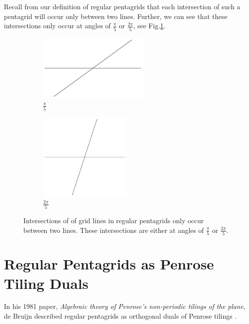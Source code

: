 \documentclass[
  oneside,
  11pt, a4paper,
  footinclude=true,
  headinclude=true,
  cleardoublepage=empty
]{scrbook}
\begin{document}
Recall from our definition of regular pentagrids that each intersection of such a pentagrid will occur only between two lines. Further, we can see that these intersections only occur at angles of $\frac{\pi}{5}$ or $\frac{2\pi}{5}$, see Fig.\ref{fig:intersections}.

\begin{figure}[H]
\centering
\begin{subfigure}[b]{0.5\textwidth}
\centering
\includegraphics[width=0.6\textwidth]{Intersection1}
\caption{$\frac{\pi}{5}$}
\end{subfigure}\hfill
\begin{subfigure}[b]{0.5\textwidth}
\centering
\includegraphics[width=0.5\textwidth]{Intersection2}
\caption{$\frac{2\pi}{5}$}
\end{subfigure}

\caption[Two types of grid line intersections]{Intersections of of grid lines in regular pentagrids only occur between two lines. These intersections are either at angles of $\frac{\pi}{5}$ or $\frac{2\pi}{5}$. }
\label{fig:intersections}
\end{figure}


\section{Regular Pentagrids as Penrose Tiling Duals}
In his 1981 paper, \textit{Algebraic theory of Penrose's non-periodic tilings of the plane}, de Bruijn described regular pentagrids as orthogonal duals of Penrose tilings \cite{DeBruijn1981}.
\end{document}
